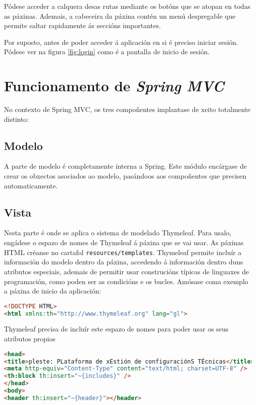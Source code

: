 Pódese acceder a calquera desas rutas mediante os botóns que se atopan en todas as páxinas. Ademais, a cabeceira da páxina contén un menú despregable que permite saltar rapidamente ás seccións importantes.

Por suposto, antes de poder acceder á aplicación en si é preciso iniciar sesión. Pódese ver na figura \ref{fig:login} como é a pantalla de inicio de sesión.

\section{Funcionamento de \textit{Spring MVC}}

No contexto de Spring MVC, os tres compoñentes implantase de xeito totalmente distinto:

\subsection{Modelo}

A parte de modelo é completamente interna a Spring. Este módulo encárgase de crear os obxectos asociados ao modelo, pasándoos aos compoñentes que precisen automaticamente.

\subsection{Vista}

Nesta parte é onde se aplica o sistema de modelado Thymeleaf. Para usalo, engádese o espazo de nomes de Thymeleaf á páxina que se vai usar. As páxinas HTML créanse no cartafol \texttt{resources/templates}. Thymeleaf permite incluír a información do modelo dentro da páxina, accedendo á información dentro duns atributos especiais, ademais de permitir usar construcións típicas de linguaxes de programación, como poden ser as condicións e os bucles. Amósase coma exemplo a páxina de inicio da aplicación:

\begin{lstlisting}[language=HTML]
<!DOCTYPE HTML>
<html xmlns:th="http://www.thymeleaf.org" lang="gl">
\end{lstlisting}

Thymeleaf precisa de incluír este espazo de nomes para poder usar os seus atributos propios

\newpage

\begin{lstlisting}[language=HTML]
<head>
<title>pleste: PLataforma de xEstión de configuraciónS TÉcnicas</title>
<meta http-equiv="Content-Type" content="text/html; charset=UTF-8" />
<th:block th:insert="~{includes}" />
</head>
<body>
<header th:insert="~{header}"></header>
\end{lstlisting}

